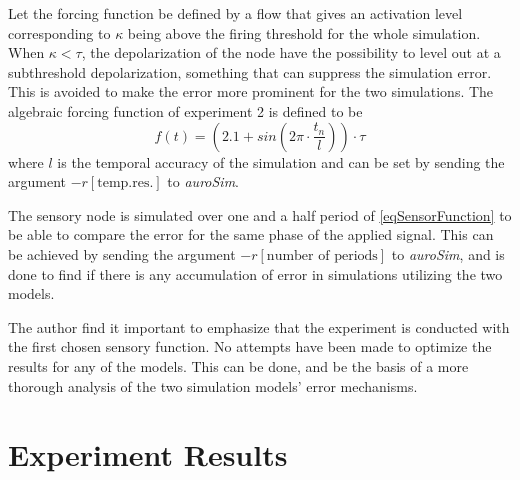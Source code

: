 	Let the forcing function be defined by a flow that gives an activation level corresponding to $\kappa$ being above the firing threshold for the whole simulation.
	When $\kappa < \tau$, the depolarization of the node have the possibility to level out at a subthreshold depolarization, something that can suppress the simulation error.
	This is avoided to make the error more prominent for the two simulations.
	The algebraic forcing function of experiment 2 is defined to be 
\begin{equation}
	f(t) = (2.1 + sin\left(2\pi \cdot \frac{t_n}{l}\right)) \cdot \tau %
	\label{eqSensorFunction}
\end{equation}
	where $l$ is the temporal accuracy of the simulation and can be set by sending the argument $-r[\text{temp.res.}]$ to \emph{auroSim}.

	The sensory node is simulated over one and a half period of \eqref{eqSensorFunction} to be able to compare the error for the same phase of the applied signal.
	This can be achieved by sending the argument $-r[\text{number of periods}]$ to \emph{auroSim}, and is done to find if there is any accumulation of error in simulations utilizing the two models. %


	The author find it important to emphasize that the experiment is conducted with the first chosen sensory function.
	No attempts have been made to optimize the results for any of the models.
	This can be done, and be the basis of a more thorough analysis of the two simulation models' error mechanisms.


	\section{Experiment Results}
